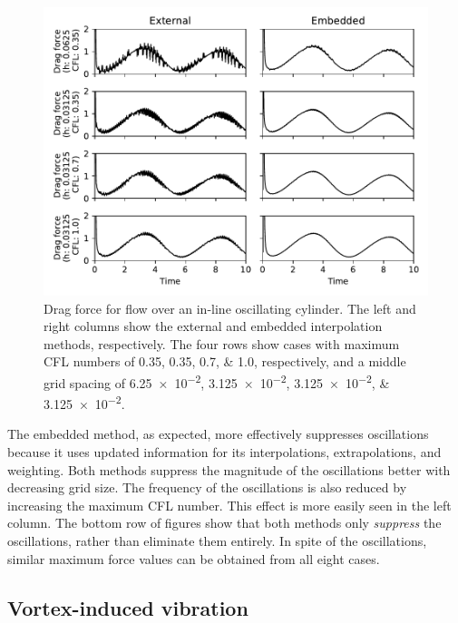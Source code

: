 \documentclass[preprint,12pt]{elsarticle}
\begin{document}
\begin{figure}[htbp]
    \centering
    \includegraphics[width=\textwidth]{osc_cylinder}
    \caption{Drag force for flow over an in-line oscillating cylinder. The left
    and right columns show the external and embedded interpolation methods, respectively.
    The four rows show cases with maximum CFL numbers of \numlist{0.35; 0.35; 0.7; 1.0},
    respectively, and a middle grid spacing of \numlist{6.25e-2; 3.125e-2; 3.125e-2; 3.125e-2}.}
    \label{fig:osccylinder}
\end{figure}

The embedded method, as expected, more effectively suppresses oscillations because
it uses updated information for its interpolations, extrapolations, and weighting.
Both methods suppress the magnitude of the oscillations better with decreasing grid size.
The frequency of the oscillations is also reduced by increasing the maximum CFL number.
This effect is more easily seen in the left column.
The bottom row of figures show that both methods only \emph{suppress} the oscillations,
rather than eliminate them entirely. In spite of the oscillations, similar maximum
force values can be obtained from all eight cases.

\subsection{Vortex-induced vibration}
\label{sec:viv}
\end{document}
